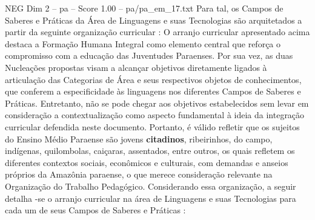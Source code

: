 \begin{textsample}{NEG Dim 2 – pa – Score 1.00 – pa/pa\_em\_17.txt}
Para tal, os Campos de Saberes e Práticas da Área de Linguagens e suas Tecnologias são arquitetados a partir da seguinte organização curricular : O arranjo curricular apresentado acima destaca a Formação Humana Integral como elemento central que reforça o compromisso com a educação das Juventudes Paraenses.
Por sua vez, as duas Nucleações propostas visam a alcançar objetivos diretamente ligados à articulação das Categorias de Área e seus respectivos objetos de conhecimentos, que conferem a especificidade às linguagens nos diferentes Campos de Saberes e Práticas.
Entretanto, não se pode chegar aos objetivos estabelecidos sem levar em consideração a contextualização como aspecto fundamental à ideia da integração curricular defendida neste documento.
Portanto, é válido refletir que os sujeitos do Ensino Médio Paraense são jovens \textbf{citadinos}, ribeirinhos, do campo, indígenas, quilombolas, caiçaras, assentados, entre outros, os quais refletem os diferentes contextos sociais, econômicos e culturais, com demandas e anseios próprios da Amazônia paraense, o que merece consideração relevante na Organização do Trabalho Pedagógico.
Considerando essa organização, a seguir detalha -se o arranjo curricular na área de Linguagens e suas Tecnologias para cada um de seus Campos de Saberes e Práticas :

\end{textsample}
